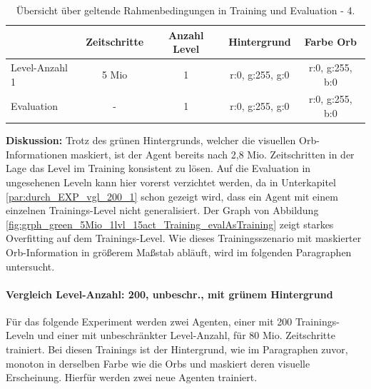 \begin{center}
 \begin{table}[htb!]
 \begin{center}
  \begin{tabular}{ l c c c c }
    \hline
			       	& Zeitschritte 	& Anzahl Level 	& Hintergrund 	& Farbe Orb \\ \hline \hline
     Level-Anzahl 1     	& 5 Mio       	& 1			& 	     r:0, g:255, g:0	& r:0, g:255, b:0 \\ \hline
     Evaluation 		& - 	           	& 1			& 	    r:0, g:255, g:0 	& r:0, g:255, b:0 \\ \hline
    \hline
  \end{tabular}
  \caption{Übersicht über geltende Rahmenbedingungen in Training und Evaluation - 4.}
  \label{tab:tab_durch_EXP_trainSetting4}
  \end{center}
 \end{table}
\end{center} 

\textbf{Diskussion:} Trotz des grünen Hintergrunds, welcher die visuellen Orb-Informationen maskiert, ist der Agent bereits nach 2,8 Mio. Zeitschritten in der Lage das Level im Training konsistent zu lösen. Auf die Evaluation in ungesehenen Leveln kann hier vorerst verzichtet werden, da in Unterkapitel \ref{par:durch_EXP_vgl_200_1} schon gezeigt wird, dass ein Agent mit einem einzelnen Trainings-Level nicht generalisiert. 
Der Graph von Abbildung \ref{fig:grph_green_5Mio_1lvl_15act_Training_evalAsTraining} zeigt starkes Overfitting auf dem Trainings-Level. Wie dieses Trainingsszenario mit maskierter Orb-Information in größerem Maßstab abläuft, wird im folgenden Paragraphen untersucht.

\paragraph{Vergleich Level-Anzahl: 200, unbeschr., mit grünem Hintergrund}\label{par:durch_EXP_vgl_200_unbeschr_green}
Für das folgende Experiment werden zwei Agenten, einer mit 200 Trainings-Leveln und einer mit unbeschränkter Level-Anzahl, für 80 Mio. Zeitschritte trainiert. Bei diesen Trainings ist der Hintergrund, wie im Paragraphen zuvor, monoton in derselben Farbe wie die Orbs und maskiert deren visuelle Erscheinung. Hierfür werden zwei neue Agenten trainiert.

